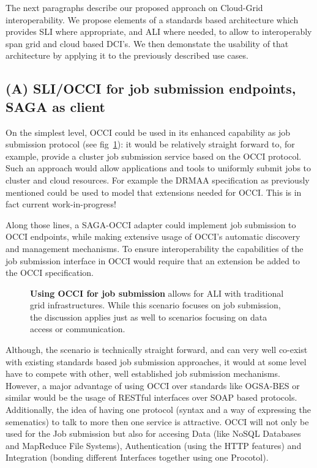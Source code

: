 \documentclass[10pt,conference,final,letterpaper,twoside,twocolumn,]{IEEEtran}
\newcommand{\B}[1]{\textbf{#1}}
\begin{document}
 The next paragraphs describe our proposed approach on Cloud-Grid
 interoperability. We propose elements of a standards based
 architecture which provides SLI where appropriate, and ALI where
 needed, to allow to interoperably span grid and cloud based DCI's.
 We then demonstate the usability of that architecture by applying it
 to the previously described use cases.
 
 \subsection{(A) SLI/OCCI for job submission endpoints, SAGA as client}
 
 On the simplest level, OCCI could be used in its enhanced capability
 as job submission protocol (see fig~\ref{fig:arch1}): it would be
 relatively straight forward to, for example, provide a cluster job
 submission service based on the OCCI protocol. Such an approach would
 allow applications and tools to uniformly submit jobs to cluster and
 cloud resources. For example the DRMAA specification as previously
 mentioned could be used to model that extensions needed for OCCI.
 This is in fact current work-in-progress!
 
 Along those lines, a SAGA-OCCI adapter could implement job submission
 to OCCI endpoints, while making extensive usage of OCCI's automatic
 discovery and management mechanisms. To ensure interoperability the
 capabilities of the job submission interface in OCCI would require
 that an extension be added to the OCCI specification.
 
 \begin{figure}[h!]
  \caption{\footnotesize\label{fig:arch1} \B{Using OCCI for job 
     submission} allows for ALI with traditional grid infrastructures.  
     While this scenario focuses on job submission, the discussion 
     applies just as well to scenarios focusing on data access or 
     communication.}
 \end{figure}
 
 Although, the scenario is technically straight forward, and can very
 well co-exist with existing standards based job submission
 approaches, it would at some level have to compete with other, well
 established job submission mechanisms. However, a major advantage of
 using OCCI over standards like OGSA-BES or similar would be the usage
 of RESTful interfaces over SOAP based protocols. Additionally, the
 idea of having one protocol (syntax and a way of expressing the
 semenatics) to talk to more then one service is attractive.  OCCI
 will not only be used for the Job submission but also for accesing
 Data (like NoSQL Databases and MapReduce File Systems),
 Authentication (using the HTTP features) and Integration (bonding
 different Interfaces together using one Procotol).
\end{document}
